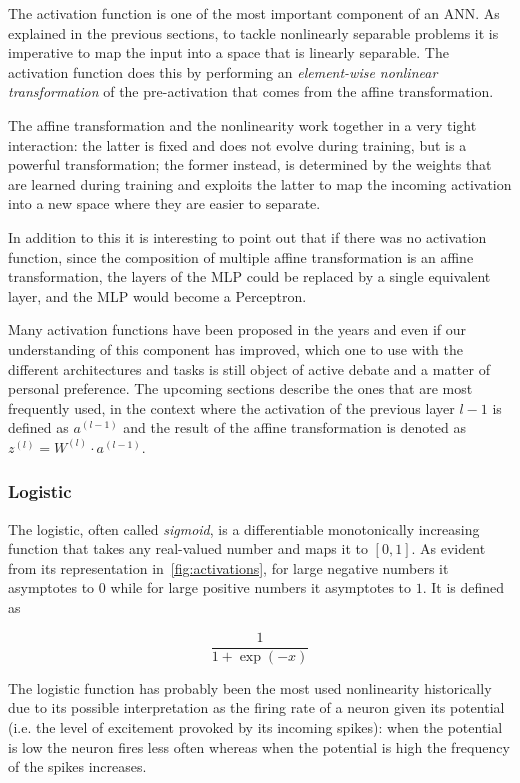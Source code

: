 The activation function is one of the most important component of an ANN. As
explained in the previous sections, to tackle nonlinearly separable problems it
is imperative to map the input into a space that is linearly separable. The
activation function does this by performing an \emph{element-wise nonlinear
transformation} of the pre-activation that comes from the affine
transformation.

The affine transformation and the nonlinearity work together in a very tight
interaction: the latter is fixed and does not evolve during training, but
is a powerful transformation; the former instead, is determined by the weights
that are learned during training and exploits the latter to map the incoming
activation into a new space where they are easier to separate.

In addition to this it is interesting to point out that if there was no
activation function, since the composition of multiple affine transformation
is an affine transformation, the layers of the MLP could be replaced by a
single equivalent layer, and the MLP would become a Perceptron.

Many activation functions have been proposed in the years and even if our
understanding of this component has improved, which one to use with the
different architectures and tasks is still object of active debate and a matter
of personal preference. The upcoming sections describe the ones that are most
frequently used, in the context where the activation of the previous layer
$l-1$ is defined as $a^{(l-1)}$ and the result of the affine transformation
is denoted as $z^{(l)} = W^{(l)} \cdot a^{(l-1)}$.

\subsubsection{Logistic}\label{sec:logistic}
The logistic, often called \emph{sigmoid}, is a differentiable monotonically
increasing function that takes any real-valued number and maps it to $[0, 1]$.
As evident from its representation in~\autoref{fig:activations}, for large
negative numbers it asymptotes to $0$ while for large positive numbers it
asymptotes to $1$. It is defined as

\begin{equation}\label{eq:sigmoid}
    \frac{1}{1+\exp(-x)}
\end{equation}

\noindent The logistic function has probably been the most used nonlinearity
historically due to its possible interpretation as the firing rate of a neuron
given its potential (i.e. the level of excitement provoked by its incoming
spikes): when the potential is low the neuron fires less often whereas when the
potential is high the frequency of the spikes increases.

